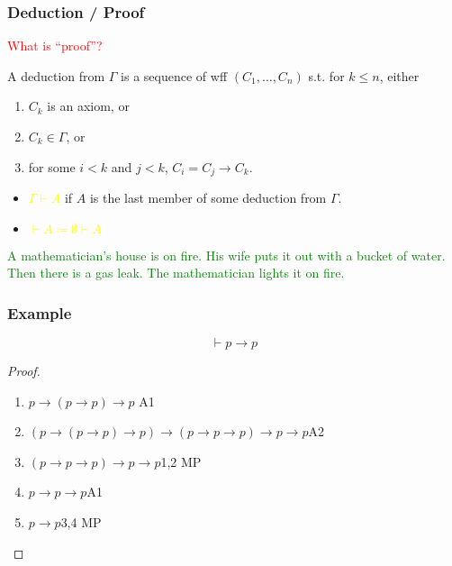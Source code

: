 \documentclass[UTF8,aspectratio=43,11pt,colorlinks,compress,openany]{beamer}%
\begin{document}
\begin{frame}\frametitle{Deduction / Proof}
	\begin{center}
	\end{center}
		\begin{block}{}
			\centering\textcolor{red}{What is ``proof''?}
		\end{block}
		\begin{definition}[Deduction]
			A deduction from $\Gamma$ is a sequence of wff $(C_1,\dots, C_n)$ s.t. for $k\leq n$, either
			\begin{enumerate}
				\item $C_k$ is an axiom, or\\
				\item $C_k\in\Gamma$, or\\
				\item for some $i<k$ and $j<k$, $C_i=C_j\to C_k$.
			\end{enumerate}
		\end{definition}
		\begin{itemize}
			\item \textcolor{yellow}{$\Gamma\vdash A$} if $A$ is the last member of some deduction from $\Gamma$.
			\item \textcolor{yellow}{$\vdash A\coloneqq \emptyset\vdash A$}
		\end{itemize}
\textcolor{green}{A mathematician's house is on fire. His wife puts it out with a bucket of water. Then there is a gas leak. The mathematician lights it on fire.}
\end{frame}

\begin{frame}\frametitle{Example}
	\begin{theorem}
		\[\vdash p\to p\]
	\end{theorem}
	\begin{proof}
		\begin{enumerate}
			\item $p\to(p\to p)\to p$ \hfill A1
			\item $(p\to(p\to p)\to p)\to(p\to p\to p)\to p\to p$\hfill A2
			\item $(p\to p\to p)\to p\to p$\hfill 1,2 MP
			\item $p\to p\to p$\hfill A1
			\item $p\to p$\hfill 3,4 MP
		\end{enumerate}
	\end{proof}
\end{frame}
\end{document}
